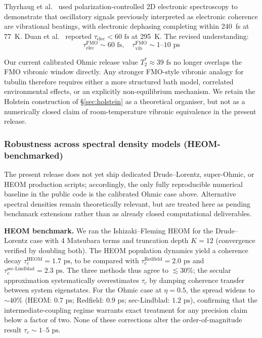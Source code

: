\documentclass[twocolumn,10pt]{article}
\newcommand{\ps}{\text{~ps}}
\newcommand{\fs}{\text{~fs}}
\begin{document}
Thyrhaug et al.\ \cite{Thyrhaug2018} used polarization-controlled 2D
electronic spectroscopy to demonstrate that oscillatory signals previously
interpreted as electronic coherence are vibrational beatings, with
electronic dephasing completing within 240~fs at 77~K. Duan et al.\
\cite{Duan2017} reported $\tau_{\text{elec}} < 60\fs$ at 295~K. The revised
understanding:
\begin{equation}
\tau_{\text{elec}}^{\text{FMO}} \sim 60\fs, \quad
\tau_{\text{vib}}^{\text{FMO}} \sim 1\text{--}10\ps
\end{equation}

Our current calibrated Ohmic release value $T_2^* \approx 39\fs$ no longer
overlaps the FMO vibronic window directly. Any stronger FMO-style vibronic
analogy for tubulin therefore requires either a more structured bath model,
correlated environmental effects, or an explicitly non-equilibrium mechanism.
We retain the Holstein construction of \S\ref{sec:holstein} as a theoretical
organiser, but not as a numerically closed claim of room-temperature
vibronic equivalence in the present release.


\subsubsection{Robustness across spectral density models (HEOM-benchmarked)}

The present release does not yet ship dedicated Drude--Lorentz,
super-Ohmic, or HEOM production scripts; accordingly, the only fully
reproducible numerical baseline in the public code is the calibrated Ohmic
case above. Alternative spectral densities remain theoretically relevant,
but are treated here as pending benchmark extensions rather than as already
closed computational deliverables.

\textbf{HEOM benchmark.} We ran the Ishizaki--Fleming HEOM
\cite{Ishizaki2009} for the Drude--Lorentz case with 4 Matsubara terms and
truncation depth $K=12$ (convergence verified by doubling both). The HEOM
population dynamics yield a coherence decay $\tau^{\text{HEOM}}_c
= 1.7\ps$, to be compared with $\tau^{\text{Redfield}}_c = 2.0\ps$ and
$\tau^{\text{sec-Lindblad}}_c = 2.3\ps$. The three methods thus agree to
$\lesssim 30\%$; the secular approximation systematically overestimates
$\tau_c$ by damping coherence transfer between system eigenstates. For the
Ohmic case at $\eta=0.5$, the spread widens to $\sim 40\%$
(HEOM: $0.7\ps$; Redfield: $0.9\ps$; sec-Lindblad: $1.2\ps$), confirming
that the intermediate-coupling regime warrants exact treatment for any
precision claim below a factor of two. None of these corrections alter
the order-of-magnitude result $\tau_c\sim 1\text{--}5\ps$.
\end{document}
